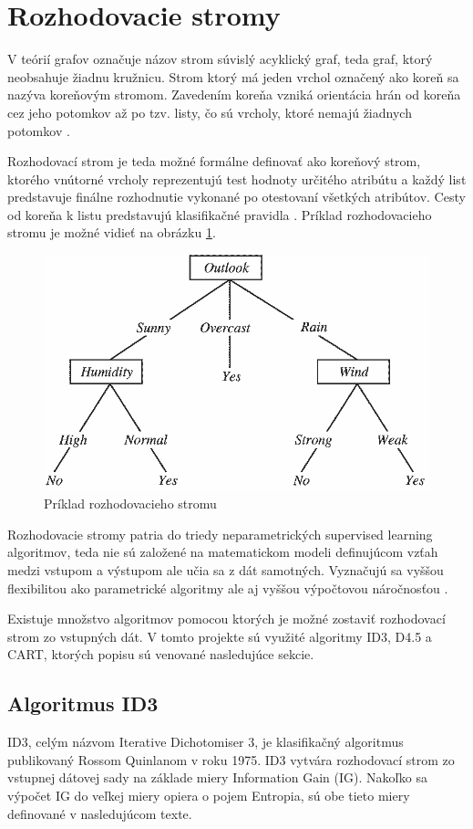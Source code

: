 \documentclass[slovak, master]{diploma}
\begin{document}
\section{Rozhodovacie stromy}
\label{sec:DecisionTreesOverview}
V teórií grafov označuje názov strom súvislý acyklický graf, teda graf, ktorý neobsahuje žiadnu kružnicu. Strom ktorý má jeden vrchol označený ako koreň sa nazýva koreňovým stromom. Zavedením koreňa vzniká orientácia hrán od koreňa cez jeho potomkov až po tzv. listy, čo sú vrcholy, ktoré nemajú žiadnych potomkov \cite{kovavr2012teorie}. 

Rozhodovací strom je teda možné formálne definovať ako koreňový strom, ktorého vnútorné vrcholy reprezentujú test hodnoty určitého atribútu a každý list predstavuje finálne rozhodnutie vykonané po otestovaní všetkých atribútov. Cesty od koreňa k listu predstavujú klasifikačné pravidla \cite{DecTreeTowards}. Príklad rozhodovacieho stromu je možné vidieť na obrázku \ref{pic:decTreeExample}.

\begin{figure}[!htbp]
    \centering
    \includegraphics[width=.7\textwidth]{Figures/strom.png}
    \caption{Príklad rozhodovacieho stromu \cite{DecTreeTowards}}
    \label{pic:decTreeExample}
\end{figure}

Rozhodovacie stromy patria do triedy neparametrických supervised learning algoritmov, teda nie sú založené na matematickom modeli definujúcom vzťah medzi vstupom a výstupom ale učia sa z dát samotných. Vyznačujú sa vyššou flexibilitou ako parametrické algoritmy ale aj vyššou výpočtovou náročnosťou \cite{paramVSnonparam}. 

Existuje množstvo algoritmov pomocou ktorých je možné zostaviť rozhodovací strom zo vstupných dát. V tomto projekte sú využité algoritmy ID3, D4.5 a CART, ktorých popisu sú venované nasledujúce sekcie. 

\subsection{Algoritmus ID3}
\label{sec:ID3}
ID3, celým názvom Iterative Dichotomiser 3, je klasifikačný algoritmus publikovaný Rossom Quinlanom v roku 1975. ID3 vytvára rozhodovací strom zo vstupnej dátovej sady na základe miery Information Gain (IG). Nakoľko sa výpočet IG do veľkej miery opiera o pojem Entropia, sú obe tieto miery definované v nasledujúcom texte. 
\end{document}
